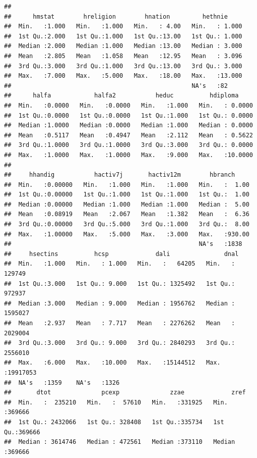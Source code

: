 \documentclass[
]{article}
\begin{document}
\begin{verbatim}
##                                                                    
##      hmstat        hreligion        hnation         hethnie      
##  Min.   :1.000   Min.   :1.000   Min.   : 4.00   Min.   : 1.000  
##  1st Qu.:2.000   1st Qu.:1.000   1st Qu.:13.00   1st Qu.: 1.000  
##  Median :2.000   Median :1.000   Median :13.00   Median : 3.000  
##  Mean   :2.805   Mean   :1.058   Mean   :12.95   Mean   : 3.096  
##  3rd Qu.:3.000   3rd Qu.:1.000   3rd Qu.:13.00   3rd Qu.: 3.000  
##  Max.   :7.000   Max.   :5.000   Max.   :18.00   Max.   :13.000  
##                                                  NA's   :82      
##      halfa            halfa2           heduc          hdiploma      
##  Min.   :0.0000   Min.   :0.0000   Min.   :1.000   Min.   : 0.0000  
##  1st Qu.:0.0000   1st Qu.:0.0000   1st Qu.:1.000   1st Qu.: 0.0000  
##  Median :1.0000   Median :0.0000   Median :1.000   Median : 0.0000  
##  Mean   :0.5117   Mean   :0.4947   Mean   :2.112   Mean   : 0.5622  
##  3rd Qu.:1.0000   3rd Qu.:1.0000   3rd Qu.:3.000   3rd Qu.: 0.0000  
##  Max.   :1.0000   Max.   :1.0000   Max.   :9.000   Max.   :10.0000  
##                                                                     
##     hhandig           hactiv7j       hactiv12m        hbranch      
##  Min.   :0.00000   Min.   :1.000   Min.   :1.000   Min.   :  1.00  
##  1st Qu.:0.00000   1st Qu.:1.000   1st Qu.:1.000   1st Qu.:  1.00  
##  Median :0.00000   Median :1.000   Median :1.000   Median :  5.00  
##  Mean   :0.08919   Mean   :2.067   Mean   :1.382   Mean   :  6.36  
##  3rd Qu.:0.00000   3rd Qu.:5.000   3rd Qu.:1.000   3rd Qu.:  8.00  
##  Max.   :1.00000   Max.   :5.000   Max.   :3.000   Max.   :930.00  
##                                                    NA's   :1838    
##     hsectins          hcsp             dali               dnal         
##  Min.   :1.000   Min.   : 1.000   Min.   :   64205   Min.   :  129749  
##  1st Qu.:3.000   1st Qu.: 9.000   1st Qu.: 1325492   1st Qu.:  972937  
##  Median :3.000   Median : 9.000   Median : 1956762   Median : 1595027  
##  Mean   :2.937   Mean   : 7.717   Mean   : 2276262   Mean   : 2029004  
##  3rd Qu.:3.000   3rd Qu.: 9.000   3rd Qu.: 2840293   3rd Qu.: 2556010  
##  Max.   :6.000   Max.   :10.000   Max.   :15144512   Max.   :19917053  
##  NA's   :1359    NA's   :1326                                          
##       dtot              pcexp              zzae             zref       
##  Min.   :  235210   Min.   :  57610   Min.   :331925   Min.   :369666  
##  1st Qu.: 2432066   1st Qu.: 328408   1st Qu.:335734   1st Qu.:369666  
##  Median : 3614746   Median : 472561   Median :373110   Median :369666  

\end{verbatim}
\end{document}
